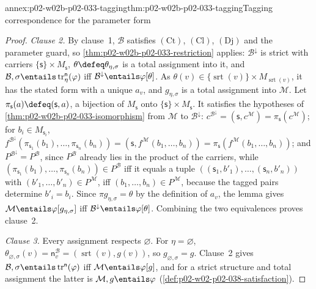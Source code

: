 \begin{annexitem}{annex:p02-w02b-p02-033-tagging}{thm:p02-w02b-p02-033-tagging}{Tagging correspondence for the parameter form}
\begin{proof}
\emph{Clause 2.}  By clause~1, \(\mathcal B\) satisfies \((\mathrm{Ct})\),
\((\mathrm{Cl})\), \((\mathrm{Dj})\) and the parameter guard, so
\cref{thm:p02-w02b-p02-033-restriction} applies: \(\mathcal B^{\downarrow}\)
is strict with carriers \(\{\mathsf s\}\times M_{\mathsf s}\),
\(\theta\defeq\theta_{\eta,\sigma}\) is a total assignment into it, and
\(\mathcal B,\sigma\entails\operatorname{tr}^{\mathsf n}_{\eta}(\varphi)\) iff
\(\mathcal B^{\downarrow}\entails\varphi[\theta]\).  As
\(\theta(v)\in\{\operatorname{srt}(v)\}\times M_{\operatorname{srt}(v)}\),
it has the stated form with a unique \(a_v\), and \(g_{\eta,\sigma}\) is a
total assignment into \(\mathcal M\).  Let
\(\pi_{\mathsf s}(a)\defeq(\mathsf s,a)\), a bijection of
\(M_{\mathsf s}\) onto \(\{\mathsf s\}\times M_{\mathsf s}\).  It satisfies
the hypotheses of \cref{thm:p02-w02b-p02-033-isomorphism} from \(\mathcal M\)
to \(\mathcal B^{\downarrow}\): \(c^{\mathcal B^{\downarrow}}=
(\mathsf s,c^{\mathcal M})=\pi_{\mathsf s}(c^{\mathcal M})\); for
\(b_i\in M_{\mathsf s_i}\),
\(f^{\mathcal B^{\downarrow}}(\pi_{\mathsf s_1}(b_1),\ldots,
\pi_{\mathsf s_n}(b_n))=(\mathsf s,f^{\mathcal M}(b_1,\ldots,b_n))=
\pi_{\mathsf s}(f^{\mathcal M}(b_1,\ldots,b_n))\); and
\(P^{\mathcal B^{\downarrow}}=P^{\mathcal B}\), since \(P^{\mathcal B}\) already
lies in the product of the carriers, while
\((\pi_{\mathsf s_1}(b_1),\ldots,\pi_{\mathsf s_n}(b_n))\in P^{\mathcal B}\) iff
it equals a tuple \(((\mathsf s_1,b'_1),\ldots,(\mathsf s_n,b'_n))\) with
\((b'_1,\ldots,b'_n)\in P^{\mathcal M}\), iff
\((b_1,\ldots,b_n)\in P^{\mathcal M}\), because the tagged pairs determine
\(b'_i=b_i\).  Since \(\pi g_{\eta,\sigma}=\theta\) by the definition of
\(a_v\), the lemma gives \(\mathcal M\entails\varphi[g_{\eta,\sigma}]\) iff
\(\mathcal B^{\downarrow}\entails\varphi[\theta]\).  Combining the two
equivalences proves clause~2.

\emph{Clause 3.}  Every assignment respects \(\varnothing\).  For
\(\eta=\varnothing\), \(\theta_{\varnothing,\sigma}(v)=\mathsf n_v^{\mathcal B}
=(\operatorname{srt}(v),g(v))\), so \(g_{\varnothing,\sigma}=g\).  Clause~2
gives \(\mathcal B,\sigma\entails\operatorname{tr}^{\mathsf n}(\varphi)\) iff
\(\mathcal M\entails\varphi[g]\), and for a strict structure and total
assignment the latter is \(\mathcal M,g\entails\varphi\)
(\cref{def:p02-w02-p02-038-satisfaction}).
\end{proof}
\end{annexitem}

